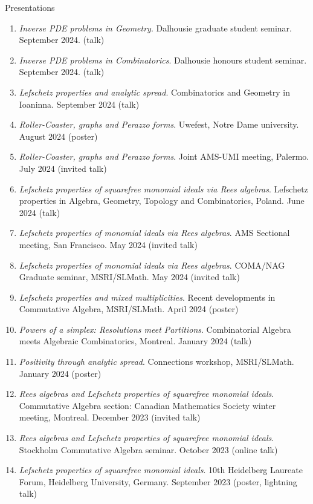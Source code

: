 \documentclass[12pt]{resume} %
\begin{document}
\begin{rSection}{Presentations}
\begin{enumerate}
        \item \textit{Inverse PDE problems in Geometry}. Dalhousie graduate student seminar. September 2024. (talk)
        \item \textit{Inverse PDE problems in Combinatorics}. Dalhousie honours student seminar. September 2024. (talk)
        \item \textit{Lefschetz properties and analytic spread}. Combinatorics and Geometry in Ioaninna. September 2024 (talk)
        \item \textit{Roller-Coaster, graphs and Perazzo forms}. Uwefest, Notre Dame university. August 2024 (poster)
        \item \textit{Roller-Coaster, graphs and Perazzo forms}. Joint AMS-UMI meeting, Palermo. July 2024 (invited talk)
        \item \textit{Lefschetz properties of squarefree monomial ideals via Rees algebras}. Lefschetz properties in Algebra, Geometry, Topology and Combinatorics, Poland. June 2024 (talk) 
        \item \textit{Lefschetz properties of monomial ideals via Rees algebras}. AMS Sectional meeting, San Francisco. May 2024 (invited talk) 
        \item \textit{Lefschetz properties of monomial ideals via Rees algebras}. COMA/NAG Graduate seminar, \newline MSRI/SLMath. May 2024 (invited talk) 
        \item \textit{Lefschetz properties and mixed multiplicities}. Recent developments in Commutative Algebra, MSRI/SLMath. April 2024 (poster)
        \item \textit{Powers of a simplex: Resolutions meet Partitions}. Combinatorial Algebra meets Algebraic Combinatorics, Montreal. January 2024 (talk)
        \item \textit{Positivity through analytic spread}. Connections workshop, MSRI/SLMath. January 2024 (poster)
        \item \textit{Rees algebras and Lefschetz properties of squarefree monomial ideals}. Commutative Algebra section: Canadian Mathematics Society winter meeting, Montreal. December 2023 (invited talk)
        \item \textit{Rees algebras and Lefschetz properties of squarefree monomial ideals}. Stockholm Commutative Algebra seminar. October 2023 (online talk)
        \item \textit{Lefschetz properties of squarefree monomial ideals}. 10th Heidelberg Laureate Forum, Heidelberg University, Germany. September 2023 (poster, lightning talk)

\end{enumerate}
\end{rSection}
\end{document}
